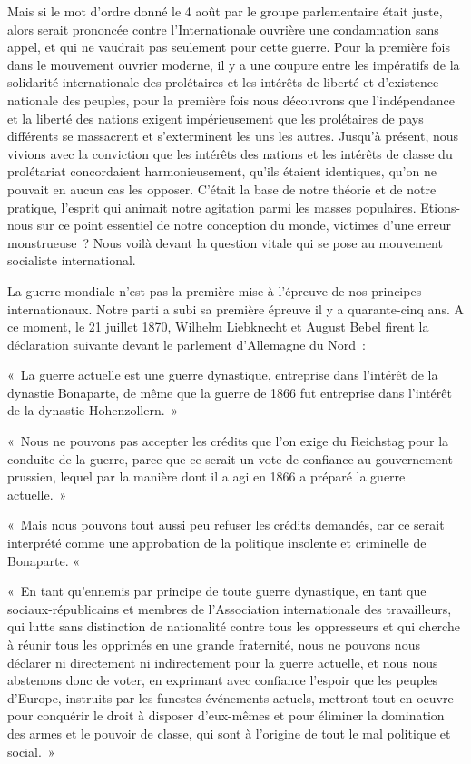 \documentclass[french,twoside]{book} %
\newenvironment{quoteblock}%
  {\begin{quoting}}
  {\end{quoting}}
\newenvironment{quotebar}{%
    \def\FrameCommand{{\color{rubric!10!}\vrule width 0.5em} \hspace{0.9em}}%
    \def\OuterFrameSep{\itemsep} %
    \MakeFramed {\advance\hsize-\width \FrameRestore}
  }%
  {%
    \endMakeFramed
  }
\renewenvironment{quoteblock}%
  {%
    \savenotes
    \setstretch{0.9}
    \normalfont
    \begin{quotebar}
  }
  {%
    \end{quotebar}
    \spewnotes
  }
\begin{document}
  Mais si le mot d’ordre donné le 4 août par le groupe parlementaire était juste, alors serait prononcée contre l’Internationale ouvrière une condamnation sans appel, et qui ne vaudrait pas seulement pour cette guerre. Pour la première fois dans le mouvement ouvrier moderne, il y a une coupure entre les impératifs de la solidarité internationale des prolétaires et les intérêts de liberté et d’existence nationale des peuples, pour la première fois nous découvrons que l’indépendance et la liberté des nations exigent impérieusement que les prolétaires de pays différents se massacrent et s’exterminent les uns les autres. Jusqu’à présent, nous vivions avec la conviction que les intérêts des nations et les intérêts de classe du prolétariat concordaient harmonieusement, qu’ils étaient identiques, qu’on ne pouvait en aucun cas les opposer. C'était la base de notre théorie et de notre pratique, l’esprit qui animait notre agitation parmi les masses populaires. Etions-nous sur ce point essentiel de notre conception du monde, victimes d’une erreur monstrueuse ? Nous voilà devant la question vitale qui se pose au mouvement socialiste international.\par
La guerre mondiale n’est pas la première mise à l’épreuve de nos principes internationaux. Notre parti a subi sa première épreuve il y a quarante-cinq ans. A ce moment, le 21 juillet 1870, Wilhelm Liebknecht et August Bebel firent la déclaration suivante devant le parlement d’Allemagne du Nord :\par

\begin{quoteblock}
 \noindent « La guerre actuelle est une guerre dynastique, entreprise dans l’intérêt de la dynastie Bonaparte, de même que la guerre de 1866 fut entreprise dans l’intérêt de la dynastie Hohenzollern. »\par
 « Nous ne pouvons pas accepter les crédits que l’on exige du Reichstag pour la conduite de la guerre, parce que ce serait un vote de confiance au gouvernement prussien, lequel par la manière dont il a agi en 1866 a préparé la guerre actuelle. »\par
 « Mais nous pouvons tout aussi peu refuser les crédits demandés, car ce serait interprété comme une approbation de la politique insolente et criminelle de Bonaparte. «\par
 « En tant qu’ennemis par principe de toute guerre dynastique, en tant que sociaux-républicains et membres de l’Association internationale des travailleurs, qui lutte sans distinction de nationalité contre tous les oppresseurs et qui cherche à réunir tous les opprimés en une grande fraternité, nous ne pouvons nous déclarer ni directement ni indirectement pour la guerre actuelle, et nous nous abstenons donc de voter, en exprimant avec confiance l’espoir que les peuples d’Europe, instruits par les funestes événements actuels, mettront tout en oeuvre pour conquérir le droit à disposer d’eux-mêmes et pour éliminer la domination des armes et le pouvoir de classe, qui sont à l’origine de tout le mal politique et social. »
\end{quoteblock}
\end{document}
